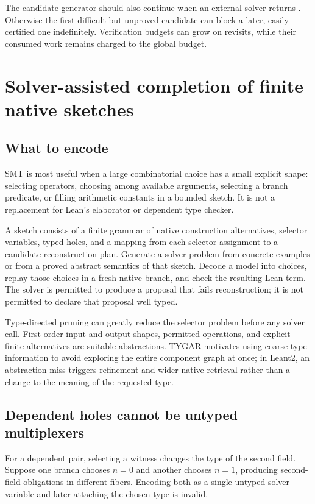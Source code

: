The candidate generator should also continue when an external solver returns . Otherwise the first difficult but unproved candidate can block a later, easily certified one indefinitely. Verification budgets can grow on revisits, while their consumed work remains charged to the global budget.

\section{Solver-assisted completion of finite native sketches}
\label{sec:smt}
\subsection{What to encode}
SMT is most useful when a large combinatorial choice has a small explicit shape: selecting operators, choosing among available arguments, selecting a branch predicate, or filling arithmetic constants in a bounded sketch. It is not a replacement for Lean's elaborator or dependent type checker.

A sketch consists of a finite grammar of native construction alternatives, selector variables, typed holes, and a mapping from each selector assignment to a candidate reconstruction plan. Generate a solver problem from concrete examples or from a proved abstract semantics of that sketch. Decode a model into choices, replay those choices in a fresh native branch, and check the resulting Lean term. The solver is permitted to produce a proposal that fails reconstruction; it is not permitted to declare that proposal well typed.

Type-directed pruning can greatly reduce the selector problem before any solver call. First-order input and output shapes, permitted operations, and explicit finite alternatives are suitable abstractions. TYGAR motivates using coarse type information to avoid exploring the entire component graph at once; in Leant2, an abstraction miss triggers refinement and wider native retrieval rather than a change to the meaning of the requested type.\cite{tygar}

\subsection{Dependent holes cannot be untyped multiplexers}
For a dependent pair, selecting a witness changes the type of the second field. Suppose one branch chooses $n=0$ and another chooses $n=1$, producing second-field obligations in different fibers. Encoding both as a single untyped solver variable and later attaching the chosen type is invalid.

